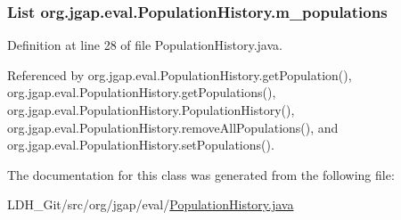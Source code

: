 \hypertarget{classorg_1_1jgap_1_1eval_1_1_population_history_a90f9a490e2c080d72cedaf3fdb06f402}{
\subsubsection[{m\-\_\-populations}]{\setlength{\rightskip}{0pt plus 5cm}List org.\-jgap.\-eval.\-Population\-History.\-m\-\_\-populations\hspace{0.3cm}{\ttfamily [private]}}}\label{classorg_1_1jgap_1_1eval_1_1_population_history_a90f9a490e2c080d72cedaf3fdb06f402}


Definition at line 28 of file Population\-History.\-java.



Referenced by org.\-jgap.\-eval.\-Population\-History.\-get\-Population(), org.\-jgap.\-eval.\-Population\-History.\-get\-Populations(), org.\-jgap.\-eval.\-Population\-History.\-Population\-History(), org.\-jgap.\-eval.\-Population\-History.\-remove\-All\-Populations(), and org.\-jgap.\-eval.\-Population\-History.\-set\-Populations().



The documentation for this class was generated from the following file\-:\begin{DoxyCompactItemize}
\item 
L\-D\-H\-\_\-\-Git/src/org/jgap/eval/\hyperlink{_population_history_8java}{Population\-History.\-java}\end{DoxyCompactItemize}
